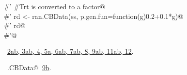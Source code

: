 \documentclass[reqno]{amsart}
\renewcommand{\NWlink}[2]{\hyperlink{#1}{#2}}
\begin{document}
\begin{flushleft}
\begin{list}{}{}
\mbox{}\verb@#' #Trt is converted to a factor@\\
\mbox{}\verb@#' rd <- ran.CBData(ss, p.gen.fun=function(g)0.2+0.1*g)@\\
\mbox{}\verb@#' rd@\\
\mbox{}\verb@#'@\\
\mbox{}\verb@@{\NWsep}
\end{list}
\vspace{-1.5ex}
\footnotesize
\begin{list}{}{\setlength{\itemsep}{-\parsep}\setlength{\itemindent}{-\leftmargin}}
\item \NWtxtFileDefBy\ \NWlink{nuweb2a}{2a}\NWlink{nuweb2b}{b}\NWlink{nuweb3a}{, 3a}\NWlink{nuweb3b}{b}\NWlink{nuweb4}{, 4}\NWlink{nuweb5a}{, 5a}\NWlink{nuweb6a}{, 6a}\NWlink{nuweb6b}{b}\NWlink{nuweb7a}{, 7a}\NWlink{nuweb7b}{b}\NWlink{nuweb8}{, 8}\NWlink{nuweb9a}{, 9a}\NWlink{nuweb9b}{b}\NWlink{nuweb11a}{, 11a}\NWlink{nuweb11b}{b}\NWlink{nuweb12}{, 12}.
\item \NWtxtIdentsUsed\nobreak\  \verb@ran.CBData@\nobreak\ \NWlink{nuweb9b}{9b}.
\item{}
\end{list}
\vspace{4ex}
\end{flushleft}
\end{document}
